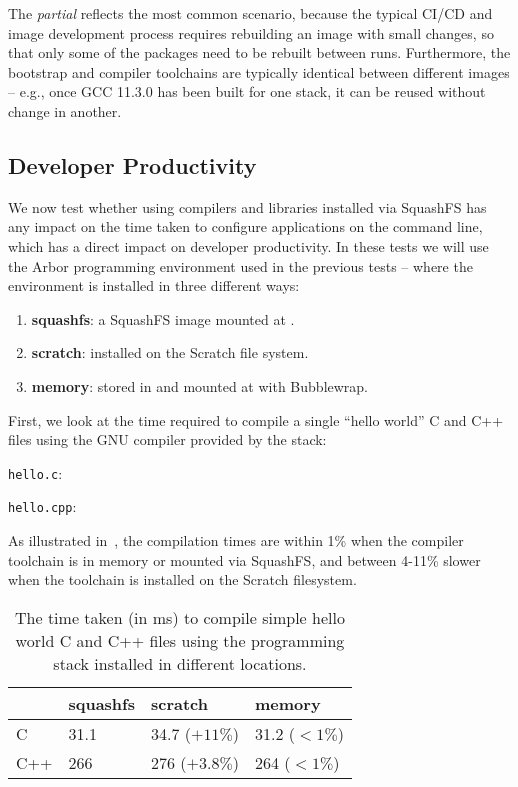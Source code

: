 The \emph{partial} reflects the most common scenario, because the typical CI/CD and image development process requires rebuilding an image with small changes, so that only some of the packages need to be rebuilt between runs.
Furthermore, the bootstrap and compiler toolchains are typically identical between different images -- e.g., once GCC 11.3.0 has been built for one stack, it can be reused without change in another.

\subsection{Developer Productivity}

We now test whether using compilers and libraries installed via SquashFS has any impact on the time taken to configure applications on the command line, which has a direct impact on developer productivity.
In these tests we will use the Arbor programming environment used in the previous tests -- where the environment is installed in three different ways:
\begin{enumerate}
    \item \textbf{squashfs}: a SquashFS image mounted at .
    \item \textbf{scratch}: installed on the Scratch file system.
    \item \textbf{memory}: stored in  and mounted at  with Bubblewrap.
\end{enumerate}

First, we look at the time required to compile a single ``hello world'' C and C++ files using the GNU compiler provided by the stack:

\noindent\texttt{hello.c}:

\noindent\texttt{hello.cpp}:


As illustrated in~, the compilation times are within 1\% when the compiler toolchain is in memory or mounted via SquashFS, and between 4-11\% slower when the toolchain is installed on the Scratch filesystem.
\begin{table}[hp!]
    \begin{center}
        \begin{tabular}{l | l l l}
                & squashfs & scratch & memory \\
                \hline
            C   &  31.1 &  34.7 ($+ 11\%$) &  31.2 ($ < 1 \%$) \\
            C++ & 266   & 276   ($+3.8\%$) & 264   ($ < 1 \%$) \\
        \end{tabular}
    \end{center}
    \caption{The time taken (in ms) to compile simple hello world C and C++ files using the programming stack installed in different locations.}
    \label{tbl:hello-world-compile}
\end{table}
    
